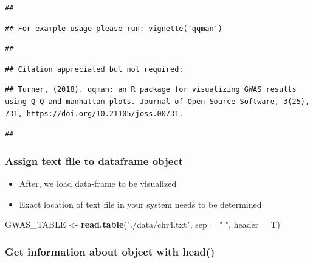 \documentclass[
]{book}
\newenvironment{Shaded}{\begin{snugshade}}{\end{snugshade}}
\newcommand{\AttributeTok}[1]{\textcolor[rgb]{0.13,0.29,0.53}{#1}}
\newcommand{\FunctionTok}[1]{\textcolor[rgb]{0.13,0.29,0.53}{\textbf{#1}}}
\newcommand{\NormalTok}[1]{#1}
\newcommand{\OtherTok}[1]{\textcolor[rgb]{0.56,0.35,0.01}{#1}}
\newcommand{\StringTok}[1]{\textcolor[rgb]{0.31,0.60,0.02}{#1}}
\begin{document}
\begin{verbatim}
## 
\end{verbatim}

\begin{verbatim}
## For example usage please run: vignette('qqman')
\end{verbatim}

\begin{verbatim}
## 
\end{verbatim}

\begin{verbatim}
## Citation appreciated but not required:
\end{verbatim}

\begin{verbatim}
## Turner, (2018). qqman: an R package for visualizing GWAS results using Q-Q and manhattan plots. Journal of Open Source Software, 3(25), 731, https://doi.org/10.21105/joss.00731.
\end{verbatim}

\begin{verbatim}
## 
\end{verbatim}

\subsubsection{Assign text file to dataframe object}\label{assign-text-file-to-dataframe-object}

\begin{itemize}
\item
  After, we load data-frame to be visualized
\item
  Exact location of text file in your system needs to be determined
\end{itemize}

\begin{Shaded}
\begin{Highlighting}[]
\NormalTok{GWAS\_TABLE }\OtherTok{\textless{}{-}} \FunctionTok{read.table}\NormalTok{(}\StringTok{"./data/chr4.txt"}\NormalTok{, }
                         \AttributeTok{sep =} \StringTok{" "}\NormalTok{,}
                         \AttributeTok{header =}\NormalTok{ T)}
\end{Highlighting}
\end{Shaded}

\subsubsection{Get information about object with head()}\label{get-information-about-object-with-head}
\end{document}
